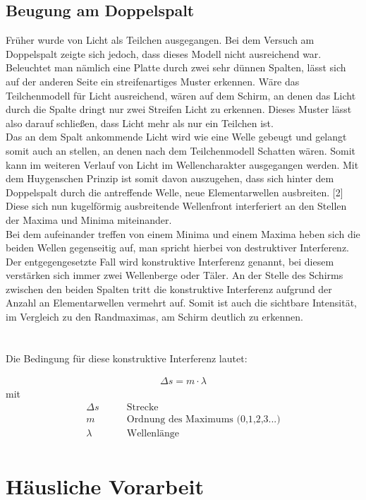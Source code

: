 \documentclass[a4paper]{scrartcl}
\numberwithin{equation}{subsection}
\begin{document}
\subsection{Beugung am Doppelspalt}
Früher wurde von Licht als Teilchen ausgegangen. Bei dem Versuch am Doppelspalt zeigte sich jedoch, dass dieses Modell nicht ausreichend war. Beleuchtet man nämlich eine Platte durch zwei sehr dünnen Spalten, lässt sich auf der anderen Seite ein streifenartiges Muster erkennen. Wäre das Teilchenmodell für Licht ausreichend, wären auf dem Schirm, an denen das Licht durch die Spalte dringt nur zwei Streifen Licht zu erkennen. Dieses Muster lässt also darauf schließen, dass Licht mehr als nur ein Teilchen ist.\\
Das an dem Spalt ankommende Licht wird wie eine Welle gebeugt und gelangt somit auch an stellen, an denen nach dem Teilchenmodell Schatten wären. Somit kann im weiteren Verlauf von Licht im Wellencharakter ausgegangen werden. Mit dem Huygenschen Prinzip ist somit davon auszugehen, dass sich hinter dem Doppelspalt durch die antreffende Welle, neue Elementarwellen ausbreiten. [2]
Diese sich nun kugelförmig ausbreitende Wellenfront interferiert an den Stellen der Maxima und Minima miteinander.\\
Bei dem aufeinander treffen von einem Minima und einem Maxima heben sich die beiden Wellen gegenseitig auf, man spricht hierbei von destruktiver Interferenz. Der entgegengesetzte Fall wird konstruktive Interferenz genannt, bei diesem verstärken sich immer zwei Wellenberge oder Täler.
An der Stelle des Schirms zwischen den beiden Spalten tritt die konstruktive Interferenz aufgrund der Anzahl an Elementarwellen vermehrt auf. Somit ist auch die sichtbare Intensität, im Vergleich zu den Randmaximas, am Schirm deutlich zu erkennen.\\
 \\
 \\
Die Bedingung für diese konstruktive Interferenz lautet:

\begin{align}
\Delta s = m \cdot \lambda
\end{align}
mit
\begin{align*}
\Delta s \qquad &\text{Strecke}\\
m \qquad &\text{Ordnung des Maximums (0,1,2,3...)}\\
\lambda \qquad &\text{Wellenlänge}\\
\end{align*}
\newpage

\section{Häusliche Vorarbeit}
\end{document}
